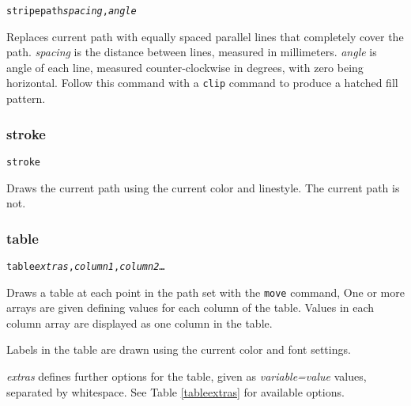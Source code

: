 \begin{alltt}
stripepath \textit{spacing}, \textit{angle}
\end{alltt}

Replaces current path with equally spaced parallel lines that completely cover
the path.  \textit{spacing} is the distance between lines, measured in
millimeters.  \textit{angle} is angle of each line, measured
counter-clockwise in degrees, with zero being horizontal.  Follow this command
with a \texttt{clip} command to produce a hatched fill pattern.

\subsubsection{stroke}

\begin{alltt}
stroke
\end{alltt}

Draws the current path using the current color and linestyle.
The current path is not.

\subsubsection{table}

\begin{alltt}
table \textit{extras}, \textit{column1}, \textit{column2} \dots
\end{alltt}

Draws a table at each point in the path set with the \texttt{move} command,
One or more arrays are given defining values for each column of the table.
Values in each column array are displayed as one column in the table.

Labels in the table are drawn using the current color and font settings.

\textit{extras} defines further options for the table, given as
\textit{variable=value} values, separated by whitespace.
See Table \ref{tableextras}
for available options.

